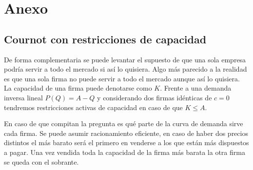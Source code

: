 \chapter{Anexo}

\section{Cournot con restricciones de capacidad}

De forma complementaria se puede levantar el supuesto de que una sola empresa podría servir a todo el mercado si así lo quisiera. Algo más parecido a la realidad es que una sola firma no puede servir a todo el mercado aunque así lo quisiera. La capacidad de una firma puede denotarse como $K$. Frente a una demanda inversa lineal $P(Q) = A-Q$ y considerando dos firmas idénticas de $c=0$ tendremos restricciones activas de capacidad en caso de que $K \leq A$. 

En caso de que compitan la pregunta es qué parte de la curva de demanda sirve cada firma. Se puede asumir racionamiento eficiente, en caso de haber dos precios distintos el más barato será el primero en venderse a los que están más dispuestos a pagar. Una vez vendida toda la capacidad de la firma más barata la otra firma se queda con el sobrante.